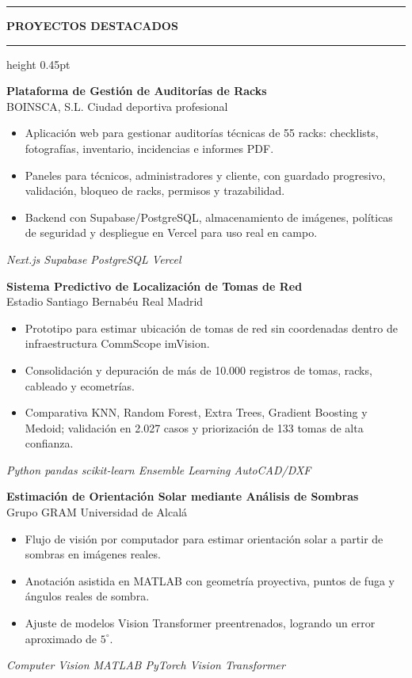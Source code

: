 \documentclass[9pt,a4paper]{article}
\newcommand{\cvsection}[1]{%
  \vspace{3pt}
  {\color{accent}\rule{7pt}{7pt}}\hspace{4pt}
  {\bfseries\color{navy}\scriptsize #1}
  \vspace{1pt}
  {\color{linegray}\hrule height 0.45pt}
  \vspace{2pt}
}
\newcommand{\project}[2]{%
  \textbf{\color{navy}#1}\\[-1pt]
  {\scriptsize\color{amber}#2}\\[-2pt]
}
\newcommand{\tags}[1]{%
  {\scriptsize\color{muted}\textit{#1}}\vspace{1.5pt}
}
\begin{document}
\hfill
\begin{minipage}[t]{0.66\textwidth}

\cvsection{PROYECTOS DESTACADOS}

\project{Plataforma de Gestión de Auditorías de Racks}{BOINSCA, S.L. \textperiodcentered{} Ciudad deportiva profesional}
\begin{itemize}
\item Aplicación web para gestionar auditorías técnicas de 55 racks: checklists, fotografías, inventario, incidencias e informes PDF.
\item Paneles para técnicos, administradores y cliente, con guardado progresivo, validación, bloqueo de racks, permisos y trazabilidad.
\item Backend con Supabase/PostgreSQL, almacenamiento de imágenes, políticas de seguridad y despliegue en Vercel para uso real en campo.
\end{itemize}
\tags{Next.js \textperiodcentered{} Supabase \textperiodcentered{} PostgreSQL \textperiodcentered{} Vercel}

\project{Sistema Predictivo de Localización de Tomas de Red}{Estadio Santiago Bernabéu \textperiodcentered{} Real Madrid}
\begin{itemize}
\item Prototipo para estimar ubicación de tomas de red sin coordenadas dentro de infraestructura CommScope imVision.
\item Consolidación y depuración de más de 10.000 registros de tomas, racks, cableado y ecometrías.
\item Comparativa KNN, Random Forest, Extra Trees, Gradient Boosting y Medoid; validación en 2.027 casos y priorización de 133 tomas de alta confianza.
\end{itemize}
\tags{Python \textperiodcentered{} pandas \textperiodcentered{} scikit-learn \textperiodcentered{} Ensemble Learning \textperiodcentered{} AutoCAD/DXF}

\project{Estimación de Orientación Solar mediante Análisis de Sombras}{Grupo GRAM \textperiodcentered{} Universidad de Alcalá}
\begin{itemize}
\item Flujo de visión por computador para estimar orientación solar a partir de sombras en imágenes reales.
\item Anotación asistida en MATLAB con geometría proyectiva, puntos de fuga y ángulos reales de sombra.
\item Ajuste de modelos Vision Transformer preentrenados, logrando un error aproximado de $5^{\circ}$.
\end{itemize}
\tags{Computer Vision \textperiodcentered{} MATLAB \textperiodcentered{} PyTorch \textperiodcentered{} Vision Transformer}


\end{minipage}
\end{document}
